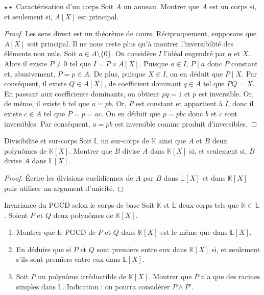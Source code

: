 \documentclass[french,a4paper]{article}
\newcommand{\K}{\mathbb{K}}
\renewcommand{\L}{\mathbb{L}}
\theoremstyle{plain}
\theoremstyle{definition}
\theoremstyle{remark}
\begin{document}
\begin{ex}{$\star\star$ Caractérisation d'un corps}
	Soit $A$ un anneau. Montrer que $A$ est un corps si, et seulement si, $A[X]$ est principal.
\end{ex}
\begin{proof}
	Les sens direct est un théorème de cours. Réciproquement, supposons que $A[X]$ soit principal. Il ne nous reste plus qu'à montrer l'inversibilité des éléments non nuls. Soit $a\in A\setminus\{0\}$. On considère $I$ l'idéal engendré par $a$ et $X$. Alors il existe $P\ne 0$ tel que $I=P\times A[X]$. Puisque $a\in I$, $P\mid a$ donc $P$ constant et, abusivement, $P=p\in A$. De plus, puisque $X\in I$, on en déduit que $P\mid X$. Par conséquent, il existe $Q\in A[X]$, de coefficient dominant $q\in A$ tel que $PQ=X$. En passant aux coefficients dominants, on obtient $pq=1$ et $p$ est inversible. Or, de même, il existe $b$ tel que $a=pb$. Or, $P$ est constant et appartient à $I$, donc il existe $c\in A$ tel que $P=p=ac$. On en déduit que $p=pbc$ donc $b$ et $c$ sont inversibles.  Par conséquent, $a=pb$ est inversible comme produit d'inversibles. 
\end{proof}

\begin{ex}[Moulin.AG.61]{Divisibilité et sur-corps}
	Soit $\L$ un sur-corps de $\K$ ainsi que $A$ et $B$ deux polynômes de $\K[X]$. Montrer que $B$ divise $A$ dans $\K[X]$ si, et seulement si, $B$ divise $A$ dans $\L[X]$.
\end{ex}
\begin{proof}
	Écrire les divisions euclidiennes de $A$ par $B$ dans $\L[X]$ et dans $\K[X]$ puis utiliser un argument d'unicité.
\end{proof}

\begin{ex}[Châteaux]{Invariance du PGCD selon le corps de base}
	Soit $\K$ et $\L$ deux corps tels que $\K\subset\L$. Soient $P$ et $Q$ deux polynômes de $\K[X]$.
	\begin{enumerate}
		\item Montrer que le PGCD de $P$ et $Q$ dans $\K[X]$ est le même que dans $\L[X]$.
		\item En déduire que si $P$ et $Q$ sont premiers entre eux dans $\K[X]$ si, et seulement s'ils sont premiers entre eux dans $\L[X]$.
		\item Soit $P$ un polynôme irréductible de $\K[X]$. Montrer que $P$ n'a que des racines simples dans $\L$. Indication : on pourra considérer $P\wedge P'$.
	\end{enumerate}
\end{ex}
\end{document}
